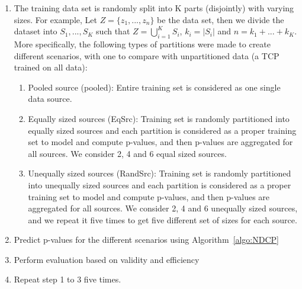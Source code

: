 \documentclass[preprint,12pt,authoryear]{elsarticle}
\begin{document}

\begin{enumerate}

\item The training data set is randomly split into K parts (disjointly) with varying sizes. For example, Let $Z = \{ z_1 , ..., z_n \} $ be the data set, then we divide the dataset into $S_1, ..., S_K$ such that $Z = \bigcup_{i=1}^K S_i$, $k_i = |S_i|$ and $n = k_1+ ...+k_K$. More specifically, the following types of partitions were made to create different scenarios, with one to compare with unpartitioned data (a TCP trained on all data):

\begin{enumerate}
	\item Pooled source (pooled): Entire training set is considered as one single data source.
	\item Equally sized sources (EqSrc): Training set is randomly partitioned into equally sized sources and  each partition is considered as a proper training set to model and compute p-values, and then p-values are aggregated for all sources. We consider 2, 4 and 6 equal sized sources. %
	\item Unequally sized sources (RandSrc): Training set is randomly partitioned into unequally sized sources and  each partition is considered as a proper training set to model and compute p-values, and then p-values are aggregated for all sources. We consider 2, 4 and 6 unequally sized sources, and we repeat it five times to get five different set of sizes for each source.

\end{enumerate}


\item Predict p-values for the different scenarios using Algorithm~\ref{algo:NDCP}

\item Perform evaluation based on validity and efficiency

\item Repeat step 1 to 3  five times.


\end{enumerate}
\end{document}

